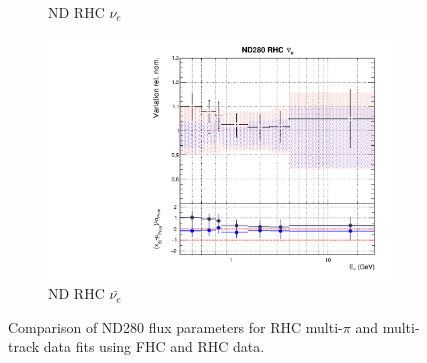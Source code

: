 \begin{figure}[t]
\begin{subfigure}{0.42\textwidth}
  \caption{ND RHC $\nu_{e}$}
\end{subfigure}
\begin{subfigure}{0.42\textwidth}
  \centering
  \includegraphics[width=0.75\linewidth]{figs/rhcmpdat28flux_7}
  \caption{ND RHC $\bar{\nu_e}$}
\end{subfigure}
\caption{Comparison of ND280 flux parameters for RHC multi-$\pi$ and multi-track data fits using FHC and RHC data.}
\label{fig:rhcmpidat28ND}
\end{figure}


